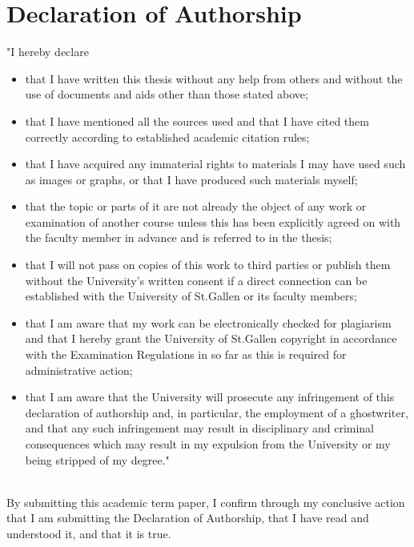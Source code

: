 \documentclass[11pt,a4paper,english,oneside]{book}
\numberwithin{equation}{chapter}
\begin{document}
\lipsum[2-8]

\newpage
{\pagestyle{firststyle}
	
\chapter*{Declaration of Authorship}

"I hereby declare
\begin{itemize}
	\item that I have written this thesis without any help from others and without the use of
	documents and aids other than those stated above;
	\item that I have mentioned all the sources used and that I have cited them correctly
	according to established academic citation rules;
	\item that I have acquired any immaterial rights to materials I may have used such as images
	or graphs, or that I have produced such materials myself;
	\item that the topic or parts of it are not already the object of any work or examination of
	another course unless this has been explicitly agreed on with the faculty member in
	advance and is referred to in the thesis;
	\item that I will not pass on copies of this work to third parties or publish them without the
	University’s written consent if a direct connection can be established with the
	University of St.Gallen or its faculty members;
	\item that I am aware that my work can be electronically checked for plagiarism and that I
	hereby grant the University of St.Gallen copyright in accordance with the Examination
	Regulations in so far as this is required for administrative action;
	\item that I am aware that the University will prosecute any infringement of this declaration
	of authorship and, in particular, the employment of a ghostwriter, and that any such
	infringement may result in disciplinary and criminal consequences which may result
	in my expulsion from the University or my being stripped of my degree."
\end{itemize}


\vspace*{3cm}


 \hfill {}\\

\vspace*{.5 cm}
\noindent By submitting this academic term paper, I confirm through my conclusive action that I am
submitting the Declaration of Authorship, that I have read and understood it, and that it is
true.
\cleardoublepage
}
\end{document}
